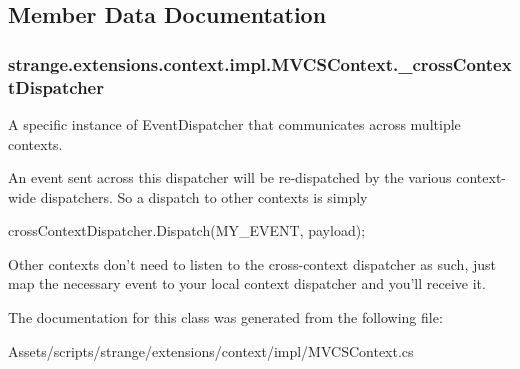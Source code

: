 \subsection{Member Data Documentation}
\hypertarget{classstrange_1_1extensions_1_1context_1_1impl_1_1_m_v_c_s_context_a55fc4efce14c8f9021cba2e25851942b}{
\subsubsection[{\-\_\-cross\-Context\-Dispatcher}]{ strange.\-extensions.\-context.\-impl.\-M\-V\-C\-S\-Context.\-\_\-cross\-Context\-Dispatcher\hspace{0.3cm}{\ttfamily [protected]}}}\label{classstrange_1_1extensions_1_1context_1_1impl_1_1_m_v_c_s_context_a55fc4efce14c8f9021cba2e25851942b}


A specific instance of Event\-Dispatcher that communicates across multiple contexts. 

An event sent across this dispatcher will be re-\/dispatched by the various context-\/wide dispatchers. So a dispatch to other contexts is simply

{\ttfamily cross\-Context\-Dispatcher.\-Dispatch(\-M\-Y\-\_\-\-E\-V\-E\-N\-T, payload)};

Other contexts don't need to listen to the cross-\/context dispatcher as such, just map the necessary event to your local context dispatcher and you'll receive it. 

The documentation for this class was generated from the following file\-:\begin{DoxyCompactItemize}
\item 
Assets/scripts/strange/extensions/context/impl/M\-V\-C\-S\-Context.\-cs\end{DoxyCompactItemize}
